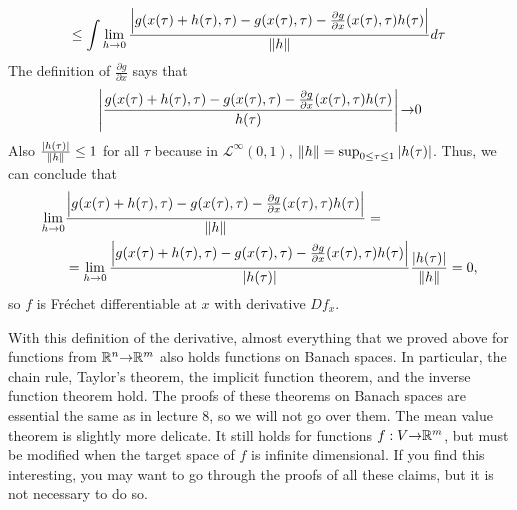 \begin{example*}
\begin{align*}
    \;\; & \leq  \int \lim_{h {\rightarrow} 0} \frac{ \left\vert { g(x(\tau) + h(\tau), \tau) -
        g(x(\tau),\tau) - \frac{\partial g}{\partial x}(x(\tau),\tau)
        h(\tau)} \right\vert } {\left\Vert {h} \right\Vert} d\tau 
  \end{align*}
  The definition of $\frac{\partial g}{\partial x}$ says that
  \[ \left\vert {\frac{ g(x(\tau) + h(\tau), \tau) -
      g(x(\tau),\tau) - \frac{\partial g}{\partial x}(x(\tau),\tau)
      h(\tau)}{h(\tau)}} \right\vert {\rightarrow} 0 \]
  Also $\frac{\left\vert {h(\tau)} \right\vert}{\left\Vert {h} \right\Vert} \leq 1$ for all $\tau$ because
  in $\mathcal{L}^\infty(0,1)$, $\left\Vert {h} \right\Vert = \sup_{0 \leq \tau \leq 1}
  \left\vert {h(\tau)} \right\vert$. Thus, we can conclude that
  \begin{align*}
    \lim_{h {\rightarrow} 0} & \frac{ \left\vert { g(x(\tau) + h(\tau), \tau) -
        g(x(\tau),\tau) - \frac{\partial g}{\partial x}(x(\tau),\tau)
        h(\tau)} \right\vert } {\left\Vert {h} \right\Vert}
    = \\ 
    & = \lim_{h {\rightarrow} 0} \frac{ \left\vert { g(x(\tau) + h(\tau), \tau) -
        g(x(\tau),\tau) - \frac{\partial g}{\partial x}(x(\tau),\tau)
        h(\tau)} \right\vert } {\left\vert {h(\tau)} \right\vert} \frac{\left\vert {h(\tau)} \right\vert} {\left\Vert {h} \right\Vert}  
    = 0,
  \end{align*}
  so $f$ is Fr\'{e}chet differentiable at $x$ with derivative $Df_x$. 
\end{example*}

With this definition of the derivative, almost everything that we
proved above for functions from $\mathbb{R}^n {\rightarrow} \mathbb{R}^m$ also holds functions
on Banach spaces. In particular, the chain rule, Taylor's theorem, the
implicit function theorem, and the inverse function theorem hold. The
proofs of these theorems on Banach spaces are essential the same as in
lecture 8, so we will not go over them. The mean value theorem is
slightly more delicate. It still holds for functions $f:V {\rightarrow} \mathbb{R}^m$,
but must be modified when the target space of $f$ is infinite
dimensional. If you find this interesting, you may want to go through
the proofs of all these claims, but it is not necessary to do so.




